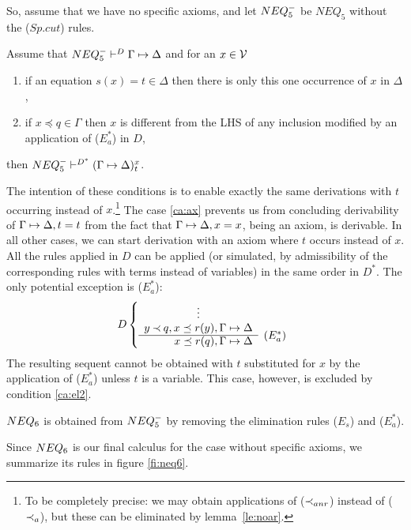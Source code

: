 So, assume that we have no specific axioms, and let $NEQ_5^-$ be $NEQ_5$
without the ($Sp.cut$) rules.
%
\begin{LEMMA}\label{le:ssp}
Assume that ${NEQ_5^-}\vdash^{{D}}\Gamma\mathrel{\mapsto}\Delta$ and for an $x\in{\cal V}$
\begin{enumerate}\MyLPar
\item\label{ca:ax} if an equation $s(x)=t \in \Delta$ then there is only this one
occurrence of $x$ in $\Delta$,
\item\label{ca:el2} if $x\preceq q \in\Gamma$ then $x$ is different from the LHS of any
inclusion modified by an application of ($E_a^*$) in $D$,
\end{enumerate}
\noindent
then ${NEQ_5^-}\vdash^{{D^*}}(\Gamma\mathrel{\mapsto}\Delta)_t^x$.
\end{LEMMA}
\begin{PROOF}
The intention of these conditions is to enable exactly the same derivations
with $t$ occurring instead of $x$.\footnote{To be completely precise: we may
obtain applications of ($\mathbin{\prec}_{anr}$) instead of ($\mathbin{\prec}_a$), but these can be
eliminated by lemma~\ref{le:noar}.}
The case \ref{ca:ax} prevents us from concluding derivability of $\Gamma\mathrel{\mapsto}\Delta, t=t$
from the fact that $\Gamma\mathrel{\mapsto}\Delta,x=x$, being an axiom, is derivable. 
In all other cases, we can
 start derivation with an axiom where $t$ occurs instead of $x$. All the
 rules applied in $D$ can be applied (or simulated, by admissibility of the
 corresponding rules with terms instead of variables) in the same order in
 $D^*$.
The only potential exception is ($E_a^*$):
\[ D \left \{ \begin{array}{rl}
 \multicolumn{1}{c}{\vdots} \\
 y\Incl q, x\preceq r(y),\GSD  \\ \cline{1-1}
 x\preceq r(q),\GSD & \rabove{(E_a^*)} \end{array} \right . \]
The resulting sequent cannot be obtained with $t$ substituted for $x$ by the
application of ($E_a^*$) unless $t$ is a variable. This case, however, is
excluded by condition \ref{ca:el2}.
\end{PROOF}

\begin{DEFINITION}\label{de:neq6}
 $NEQ_6$ is obtained from $NEQ_5^-$ by removing the elimination rules ($E_s$)
 and ($E_a^*$).
\end{DEFINITION}
\noindent
Since $NEQ_6$ is our final calculus for the case without specific axioms, we
summarize its rules in figure \ref{fi:neq6}. 

